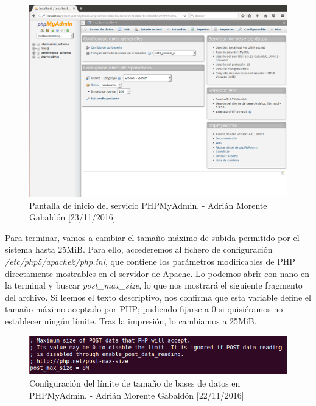 \begin{figure}[H]
	\centering
	\includegraphics[scale=0.3]{phpmyadmin-localhost}
	\caption{Pantalla de inicio del servicio PHPMyAdmin. - Adrián Morente Gabaldón [23/11/2016]}
	\label{fig:figura23}
\end{figure}
Para terminar, vamos a cambiar el tamaño máximo de subida permitido por el sistema hasta 25MiB. Para ello, accederemos al fichero de configuración \emph{/etc/php5/apache2/php.ini}, que contiene los parámetros modificables de PHP directamente mostrables en el servidor de Apache. Lo podemos abrir con nano en la terminal y buscar \emph{post\_max\_size}, lo que nos mostrará el siguiente fragmento del archivo. Si leemos el texto descriptivo, nos confirma que esta variable define el tamaño máximo aceptado por PHP; pudiendo fijarse a 0 si quisiéramos no establecer ningún límite. Tras la impresión, lo cambiamos a 25MiB.
\begin{figure}[H]
	\centering
	\includegraphics[scale=0.75]{php-max}
	\caption{Configuración del límite de tamaño de bases de datos en PHPMyAdmin. - Adrián Morente Gabaldón [22/11/2016]}
	\label{fig:figura19}
\end{figure}


